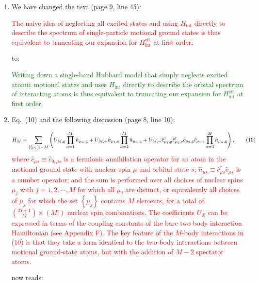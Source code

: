 \documentclass[preprint,showkeys,nofootinbib]{revtex4-1}
\renewcommand{\t}{\text} %
\newcommand{\p}[1]{\left(#1\right)} %
\renewcommand{\set}[1]{\left\{#1\right\}} %
\newcommand{\g}{\text{g}}
\newcommand{\e}{\text{e}}
\renewcommand{\c}{\hat{c}}
\newcommand{\n}{\hat{n}}
\newcommand{\1}{\mathds{1}}
\newcommand{\red}[1]{\textcolor{red}{#1}}
\newcommand{\green}[1]{\textcolor{green}{#1}}
\newcounter{point}
\newcommand{\step}{\stepcounter{point}\setcounter{enumi}{0}}
\begin{document}
\begin{enumerate}[label=(R1.\arabic{point}.\arabic*)]
\item We have changed the text (page 9, line 45):

  \red{The naive idea of neglecting all excited states and using
    $H_{\t{int}}$ directly to describe the spectrum of single-particle
    motional ground states is thus equivalent to truncating our
    expansion for $H_{\t{int}}^{\t{eff}}$ at first order.}

  to:

  \green{Writing down a single-band Hubbard model that simply neglects
    excited atomic motional states and uses $H_{\t{int}}$ directly to
    describe the orbital spectrum of interacting atoms is thus
    equivalent to truncating our expansion for $H_{\t{int}}^{\t{eff}}$
    at first order.}


  \step
\item Eq.~(10) and the following discussion (page 8, line 10):

  \red{\begin{align*} H_M = \sum_{\abs{\set{\mu_j}}=M} \p{U_{M,\g}
        \prod_{\alpha=1}^M \n_{\mu_\alpha,\g} + U_{M,+} \n_{\mu_1,\e}
        \prod_{\alpha=2}^M \n_{\mu_\alpha,\g} + U_{M,-}
        \c_{\mu_1,\g}^\dag \c_{\mu_2,\e}^\dag \c_{\mu_2,\g}
        \c_{\mu_1,\e} \prod_{\alpha=3}^M \n_{\mu_\alpha,\g}},
      \tag{10}
    \end{align*}
    where $\c_{\mu s}\equiv\c_{0,\mu s}$ is a fermionic annihilation
    operator for an atom in the motional ground state with nuclear
    spin $\mu$ and orbital state $s$;
    $\n_{\mu s}\equiv \c_{\mu s}^\dag \c_{\mu s}$ is a number
    operator; and the sum is performed over all choices of nuclear
    spins $\mu_j$ with $j=1,2,\cdots,M$ for which all $\mu_j$ are
    distinct, or equivalently all choices of $\mu_j$ for which the set
    $\set{\mu_j}$ contains $M$ elements, for a total of
    ${2I+1\choose M}\times\p{M!}$ nuclear spin combinations.  The
    coefficients $U_X$ can be expressed in terms of the coupling
    constants of the bare two-body interaction Hamiltonian (see
    Appendix F).  The key feature of the $M$-body interactions in (10)
    is that they take a form identical to the two-body interactions
    between motional ground-state atoms, but with the addition of
    $M-2$ spectator atoms.}

  now reads:


\end{enumerate}
\end{document}
